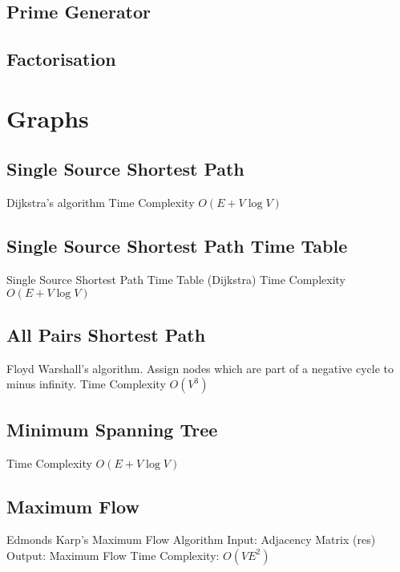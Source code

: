 \documentclass{article}
\begin{document}
\begin{multicols}{3}
\subsection{Prime Generator}


\subsection{Factorisation}




\section{Graphs}

\subsection{Single Source Shortest Path}
Dijkstra's algorithm \newline
Time Complexity $O(E + V\log V)$


\subsection{Single Source Shortest Path Time Table}
Single Source Shortest Path Time Table (Dijkstra)  \newline
Time Complexity $O(E + V\log V)$


\subsection{All Pairs Shortest Path}
Floyd Warshall's algorithm. Assign nodes which are part of a negative cycle to minus infinity. \newline
Time Complexity $O(V^3)$


\subsection{Minimum Spanning Tree}
Time Complexity $O(E + V\log V)$


\subsection{Maximum Flow}
Edmonds Karp's Maximum Flow Algorithm \newline
Input:               Adjacency Matrix (res) \newline
Output:              Maximum Flow \newline
Time Complexity:     $O(VE^2)$


\end{multicols}
\end{document}
